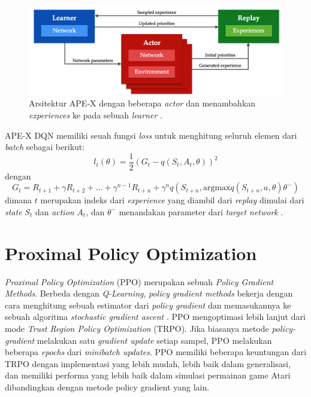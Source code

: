\begin{figure}[H]
  \centering
    \includegraphics[scale=0.6]{gambar/apex1.png}
    \caption{Arsitektur APE-X dengan beberapa \emph{actor} dan menambahkan \emph{experiences} ke pada sebuah \emph{learner} \citep{apexDQN}.}
    \label{fig:apexDQNArchitecture}
\end{figure}

APE-X DQN memiliki seuah fungsi \emph{loss} untuk menghitung seluruh elemen dari \emph{batch} sebagai berikut:
\begin{equation}
  l_{t} (\theta) = \frac{1}{2}\left(G_{t}-q\left(S_{t},A_{t},\theta\right)\right)^2
\end{equation}
dengan 
\begin{equation}
  G_{t} = R_{t+1} + \gamma R_{t+2} + \dots + \gamma ^{n-1}R_{t+n} + \gamma ^{n}q\left(S_{t+n}, \text{argmax} q\left(S_{t+n},a,\theta \right)\theta ^{-}\right)
\end{equation}
dimana $t$ merupakan indeks dari \emph{experience} yang diambil dari \emph{replay} dimulai dari \emph{state} $S_{t}$ dan \emph{action} $A_{t}$,
dan $\theta^{-}$ menandakan parameter dari \emph{target network} \citep{apexDQN}.

\section{Proximal Policy Optimization}

\emph{Proximal Policy Optimization} (PPO) merupakan sebuah \emph{Policy Gradient Methods}. 
Berbeda dengan \emph{Q-Learning}, \emph{policy gradient methods} bekerja dengan cara menghitung sebuah estimator dari \emph{policy gradient} dan memasukannya ke
sebuah algoritma \emph{stochastic gradient ascent} \citep{ppo}. PPO mengoptimasi lebih lanjut dari mode \emph{Trust Region Policy Optimization} (TRPO).
Jika biasanya metode \emph{policy-gradient} melakukan satu \emph{gradient update} setiap sampel, PPO melakukan beberapa \emph{epochs} dari \emph{minibatch updates}. 
PPO memiliki beberapa keuntungan dari TRPO dengan implementasi yang lebih mudah, lebih baik dalam generalisasi, 
dan memiliki performa yang lebih baik dalam simulasi permainan game Atari dibandingkan dengan metode policy gradient yang lain.

